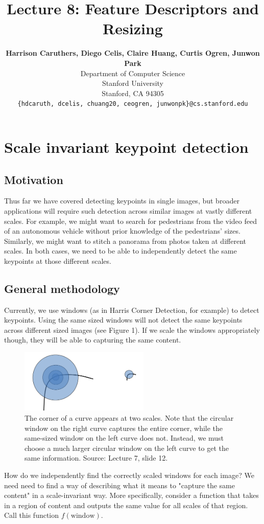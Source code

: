 \documentclass{article}
\title{Lecture 8: Feature Descriptors and Resizing}
\author{
  \textbf{Harrison Caruthers, Diego Celis, Claire Huang, Curtis Ogren, Junwon Park} \\
  Department of Computer Science\\
  Stanford University\\
  Stanford, CA 94305 \\
  \texttt{\{hdcaruth, dcelis, chuang20, ceogren, junwonpk\}@cs.stanford.edu} \\
}
\begin{document}
\maketitle

\section{Scale invariant keypoint detection}
\subsection{Motivation}
Thus far we have covered detecting keypoints in single images, but broader applications will require such detection across similar images at vastly different scales. For example, we might want to search for pedestrians from the video feed of an autonomous vehicle without prior knowledge of the pedestrians' sizes. Similarly, we might want to stitch a panorama from photos taken at different scales. In both cases, we need to be able to independently detect the same keypoints at those different scales.

\subsection{General methodology}
Currently, we use windows (as in Harris Corner Detection, for example) to detect keypoints. Using the same sized windows will not detect the same keypoints across different sized images (see Figure 1). If we scale the windows appropriately though, they will be able to capturing the same content.

\begin{figure}[h]
  \centering
  \includegraphics[width=0.55\textwidth]{corners}
  \caption{The corner of a curve appears at two scales. Note that the circular window on the right curve captures the entire corner, while the same-sized window on the left curve does not. Instead, we must choose a much larger circular window on the left curve to get the same information. Source: Lecture 7, slide 12.}
\end{figure}

How do we independently find the correctly scaled windows for each image? We need need to find a way of describing what it means to "capture the same content" in a scale-invariant way. More specifically, consider a function that takes in a region of content and outputs the same value for all scales of that region. Call this function $f(\text{window})$.
\end{document}
